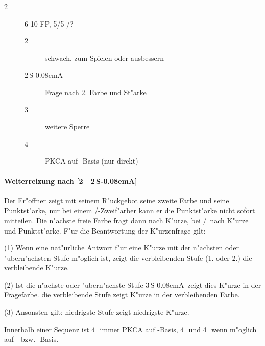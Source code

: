 \documentclass[11pt,german,twocolumn]{scrartcl}
\renewcommand{\Cl}{{\color{ClColor}{\clubs}}}
\renewcommand{\Di}{{\color{DiColor}{\sdiamonds}}}
\renewcommand{\He}{{\color{HeColor}{\shearts}}}
\renewcommand{\Sp}{{\color{SpColor}{\spades}}}
\def\pik{\,\Sp}
\def\coe{\,\He}
\def\kar{\,\Di}
\def\tre{\,\Cl}
\def\co{\He}
\def\ka{\Di}
\def\tr{\Cl}
\def\sa{\textsf{S\kern-0.08emA}}
\def\SA{\,\sa}
\def\sep{\,--\,}
\def\bdsc{\begin{description}}
\def\edsc{\end{description}}
\begin{document}
\bdsc
\item[2\coe] 6-10 FP, 5/5 \co/?
  \bdsc
  \item[2\pik] schwach, zum Spielen oder ausbessern
  \item[2\SA] Frage nach 2. Farbe und St"arke
  \item[3\coe] weitere Sperre
  \item[4\tre] PKCA auf \co-Basis (nur direkt)
  \edsc
\edsc

\paragraph{Weiterreizung nach [2\coe\sep2\SA]}

Der Er"offner zeigt mit seinem R"uckgebot seine zweite Farbe und seine
Punktst"arke, nur bei einem \co/\tr-Zweif"arber kann er die Punktst"arke nicht
sofort mitteilen. Die n"achste freie Farbe fragt dann nach K"urze, bei \co/\tr\
nach K"urze und Punktst"arke. F"ur die Beantwortung der K"urzenfrage gilt:

(1) Wenn eine nat"urliche Antwort f"ur eine K"urze mit der n"achsten oder
"ubern"achsten Stufe m"oglich ist, zeigt die verbleibenden Stufe (1. oder 2.)
die verbleibende K"urze.

(2) Ist die n"achste oder "ubern"achste Stufe 3\SA\, zeigt dies K"urze in der
Fragefarbe. die verbleibende Stufe zeigt K"urze in der verbleibenden Farbe.

(3) Ansonsten gilt: niedrigste Stufe zeigt niedrigste K"urze.

Innerhalb einer Sequenz ist 4\pik\ immer PKCA auf \co-Basis, 4\tre\ und 4\kar\
wenn m"oglich auf \tr- bzw. \ka-Basis.
\end{document}
